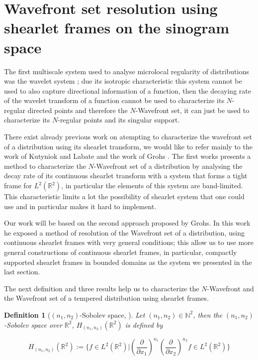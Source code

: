\documentclass[a4paper]{article}
\newtheorem{definition}{Definition}
\begin{document}
\bigskip

\section{Wavefront set resolution using shearlet frames on the sinogram space}

The first multiscale system used to analyse microlocal regularity of distributions was the wavelet system \cite{Ten-lectures}; due its isotropic characteristic this system cannot be used to also capture directional information of a function, then the decaying rate of the wavelet transform of a function cannot be used to characterize its $N$-regular directed points and therefore the $N$-Wavefront set, it can just be used to characterize its $N$-regular points and its singular support.

\bigskip

There exist already previous work on atempting to characterize the wavefront set of a distribution using its shearlet transform, we would like to refer mainly to the work of Kutyniok and Labate \cite{WaveFrontSetGitta} and the work of Grohs \cite{WaveFrontSetGrohs}. The first works presents a method to characterize the $N$-Wavefront set of a distribution by analysing the decay rate of its continuous shearlet transform with a system that forms a tight frame for $L^2(\mathbb{R}^2)$, in particular the elements of this system are band-limited. This characteristic limits a lot the possibility of shearlet system that one could use and in particular makes it hard to implement.

\bigskip

Our work will be based on the second approach proposed by Grohs. In this work he exposed a method of resolution of the Wavefront set of a distribution, using continuous shearlet frames with very general conditions; this allow us to use more general constructions of continuous shearlet frames, in particular, compactly supported shearlet frames in bounded domains as the system we presented in the last section.

\bigskip

The next definition and three results help us to characterize the $N$-Wavefront and the Wavefront set of a tempered distribution using shearlet frames. 

\bigskip

\begin{definition}[$(n_1,n_2)$-Sobolev space, \cite{WaveFrontSetGrohs}]
Let $(n_1,n_2)\in\mathbb{N}^2$, then the $(n_1,n_2)$-Sobolev space over $\mathbb{R}^2$, $H_{(n_1,n_2)}(\mathbb{R}^2)$ is defined by 

$$
H_{(n_1,n_2)}(\mathbb{R}^2):=\{ f\in L^2(\mathbb{R}^2) \big| \left(\frac{\partial}{\partial x_1}\right)^{n_1}\left(\frac{\partial}{\partial x_2}\right)^{n_2}f\in L^2(\mathbb{R}^2)\}
$$
\end{definition}
\end{document}
